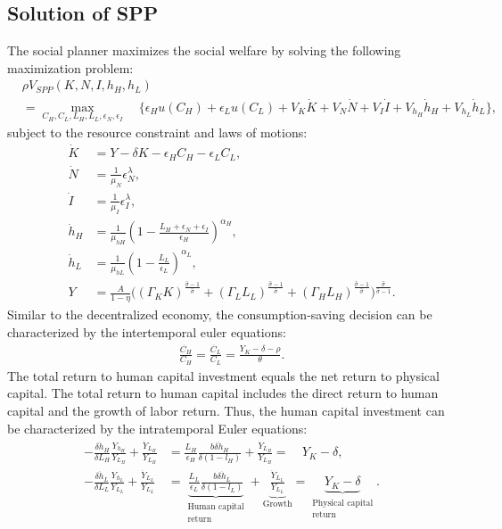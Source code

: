 \documentclass[12pt]{article}
\begin{document}
\subsection{Solution of SPP}
The social planner maximizes the social welfare by solving the following maximization problem:
\begin{align*}
&\rho V_{SPP}(K,N,I,h_H,h_L)  \\
&= \max_{C_H, C_L,L_H,L_L,\epsilon_N, \epsilon_I} \quad \{\epsilon_H u(C_H)+\epsilon_L u(C_L)+V_K\dot{K}+V_N\dot{N}+V_I\dot{I}+V_{h_H}\dot{h}_H+V_{h_L}\dot{h}_L\},
\end{align*}
subject to the resource constraint and laws of motions: 
\begin{align*}
\dot{K} &= Y-\delta K-\epsilon_H C_H-\epsilon_L C_L, \\
\dot{N} &= \frac{1}{\mu_N}\epsilon_N^{\lambda}, \\
\dot{I} &= \frac{1}{\mu_I}\epsilon_I^{\lambda}, \\
\dot{h}_H &= \frac{1}{\mu_{hH}} (1-\frac{L_H+\epsilon_N+\epsilon_I}{\epsilon_H})^{\alpha_H}, \\
\dot{h}_L &= \frac{1}{\mu_{hL}} (1-\frac{L_L}{\epsilon_L})^{\alpha_L}, \\
Y &= \frac{A}{1-\eta}\Big((\Gamma_KK)^{\frac{\hat{\sigma}-1}{\hat{\sigma}}}+(\Gamma_LL_L)^{\frac{\hat{\sigma}-1}{\hat{\sigma}}}+(\Gamma_HL_H)^{\frac{\hat{\sigma}-1}{\hat{\sigma}}}\Big)^{\frac{\hat{\sigma}}{\hat{\sigma}-1}}.
\end{align*}
Similar to the decentralized economy, the consumption-saving decision can be characterized by the intertemporal euler equations:
\begin{align*}
\frac{\dot{C_H}}{C_H} = \frac{\dot{C_L}}{C_L} = \frac{Y_K-\delta-\rho}{\theta}.
\end{align*}
The total return to human capital investment equals the net return to physical capital. The total return to human capital includes the direct return to human capital and the growth of labor return. Thus, the human capital investment can be characterized by the intratemporal Euler equations: 
\begin{align*}
-\frac{\delta \dot{h}_H}{\delta L_H}\frac{Y_{h_H}}{Y_{L_H}}+\frac{\dot{Y}_{L_H}}{Y_{L_H}} &=\frac{L_H}{\epsilon_H}\frac{b \delta \dot{h}_H}{\delta(1-l_H)}+\frac{\dot{Y}_{L_H}}{Y_{L_H}} = \quad Y_K-\delta, \\
-\frac{\delta \dot{h}_L}{\delta L_L}\frac{Y_{h_L}}{Y_{L_L}}+\frac{\dot{Y}_{L_L}}{Y_{L_L}} &= \underbrace{\frac{L_L}{\epsilon_L}\frac{b \delta \dot{h}_L}{\delta(1-l_L)}}_{\substack{\text{Human capital}\\ \text{return}}}+\underbrace{\frac{\dot{Y}_{L_L}}{Y_{L_L}}}_{\text{Growth}} = \underbrace{Y_K-\delta}_{\substack{\text{Physical capital}\\ \text{return}}}. 
\end{align*}
\end{document}
